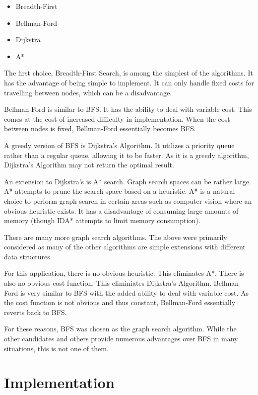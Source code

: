 \documentclass[12pt,letterpaper,oneside]{report}
\theoremstyle{definition}
\begin{document}
			\begin{itemize}
				\item Breadth-First
				\item Bellman-Ford
				\item Dijkstra
				\item A*
			\end{itemize}
			
			The first choice, Breadth-First Search, is among the simplest of the algorithms.  It has the advantage of being simple to implement.  It can only handle fixed costs for travelling between nodes, which can be a disadvantage.
			
			Bellman-Ford is similar to BFS.  It has the ability to deal with variable cost.  This comes at the cost of increased difficulty in implementation.  When the cost between nodes is fixed, Bellman-Ford essentially becomes BFS.
			
			A greedy version of BFS is Dijkstra's Algorithm.  It utilizes a priority queue rather than a regular queue, allowing it to be faster.  As it is a greedy algorithm, Dijkstra's Algorithm may not return the optimal result.
			
			An extension to Dijkstra's is A* search.  Graph search spaces can be rather large.  A* attempts to prune the search space based on a heuristic.  A* is a natural choice to perform graph search in certain areas such as computer vision where an obvious heuristic exists.  It has a disadvantage of consuming large amounts of memory (though IDA* attempts to limit memory consumption).
			
			There are many more graph search algorithms.  The above were primarily considered as many of the other algorithms are simple extensions with different data structures.
			
			For this application, there is no obvious heuristic.  This eliminates A*.  There is also no obvious cost function.  This eliminiates Dijkstra's Algorithm.  Bellman-Ford is very similar to BFS with the added ability to deal with variable cost.  As the cost function is not obvious and thus constant, Bellman-Ford essentially reverts back to BFS.
			
			For these reasons, BFS was chosen as the graph search algorithm.  While the other candidates and others provide numerous advantages over BFS in many situations, this is not one of them.
	
	\chapter{Implementation}
\end{document}
